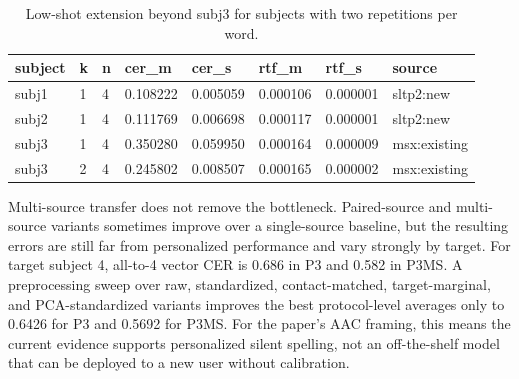 \begin{table}[t]
\centering
\caption{Low-shot extension beyond subj3 for subjects with two repetitions per word.}
\label{tab:lowshot_extended}
\begin{tabular}{llllllll}
\hline
subject & k & n & cer_m & cer_s & rtf_m & rtf_s & source \\
\hline
subj1 & 1 & 4 & 0.108222 & 0.005059 & 0.000106 & 0.000001 & sltp2:new \\
subj2 & 1 & 4 & 0.111769 & 0.006698 & 0.000117 & 0.000001 & sltp2:new \\
subj3 & 1 & 4 & 0.350280 & 0.059950 & 0.000164 & 0.000009 & msx:existing \\
subj3 & 2 & 4 & 0.245802 & 0.008507 & 0.000165 & 0.000002 & msx:existing \\
\hline
\end{tabular}
\end{table}

Multi-source transfer does not remove the bottleneck. Paired-source and multi-source variants sometimes improve over a single-source baseline, but the resulting errors are still far from personalized performance and vary strongly by target. For target subject 4, all-to-4 vector CER is 0.686 in P3 and 0.582 in P3MS. A preprocessing sweep over raw, standardized, contact-matched, target-marginal, and PCA-standardized variants improves the best protocol-level averages only to 0.6426 for P3 and 0.5692 for P3MS. For the paper's AAC framing, this means the current evidence supports personalized silent spelling, not an off-the-shelf model that can be deployed to a new user without calibration.


